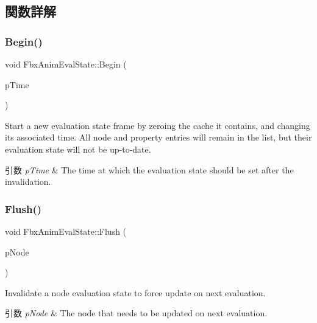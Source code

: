 \subsection{関数詳解}
\mbox{\label{class_fbx_anim_eval_state_aff48b77374c628e0e5e02d0dcb5aee55}} 
\subsubsection{\texorpdfstring{Begin()}{Begin()}}
{\footnotesize\ttfamily void Fbx\+Anim\+Eval\+State\+::\+Begin (\begin{DoxyParamCaption}\item[{const \hyperlink{class_fbx_time}{Fbx\+Time} \&}]{p\+Time }\end{DoxyParamCaption})}

Start a new evaluation state frame by zeroing the cache it contains, and changing its associated time. All node and property entries will remain in the list, but their evaluation state will not be up-\/to-\/date. 
\begin{DoxyParams}{引数}
{\em p\+Time} & The time at which the evaluation state should be set after the invalidation. \\
\hline
\end{DoxyParams}
\mbox{\label{class_fbx_anim_eval_state_a7e647a8391cf8f0356e38e0fd86f5310}} 
\subsubsection{\texorpdfstring{Flush()}{Flush()}\hspace{0.1cm}{\footnotesize\ttfamily [1/2]}}
{\footnotesize\ttfamily void Fbx\+Anim\+Eval\+State\+::\+Flush (\begin{DoxyParamCaption}\item[{\hyperlink{class_fbx_node}{Fbx\+Node} $\ast$}]{p\+Node }\end{DoxyParamCaption})}

Invalidate a node evaluation state to force update on next evaluation. 
\begin{DoxyParams}{引数}
{\em p\+Node} & The node that needs to be updated on next evaluation. \\
\hline
\end{DoxyParams}
\mbox{\label{class_fbx_anim_eval_state_aaeebbdfac04c6dbe42c992bc484698c3}} 

